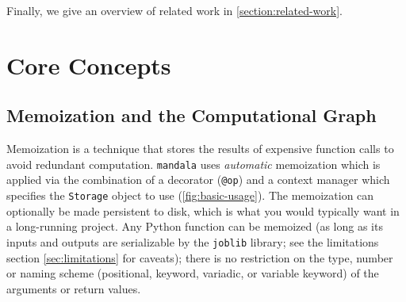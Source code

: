 Finally, we give an overview of related work in \autoref{section:related-work}.

\section{Core Concepts}
\label{section:core-concepts}

\subsection{Memoization and the Computational Graph}

Memoization is a technique that stores the results of expensive function calls
to avoid redundant computation. \texttt{mandala} uses \emph{automatic}
memoization \citep{norvig1991techniques} which is applied via the combination of
a decorator (\texttt{@op}) and a context manager which specifies the
\texttt{Storage} object to use (\autoref{fig:basic-usage}). The memoization
can optionally be made persistent to disk, which is what you would typically
want in a long-running project. Any Python function can be memoized (as long as
its inputs and outputs are serializable by the \texttt{joblib} library; see the
limitations section \ref{sec:limitations} for caveats); there is no restriction
on the type, number or naming scheme (positional, keyword, variadic, or variable
keyword) of the arguments or return values.

